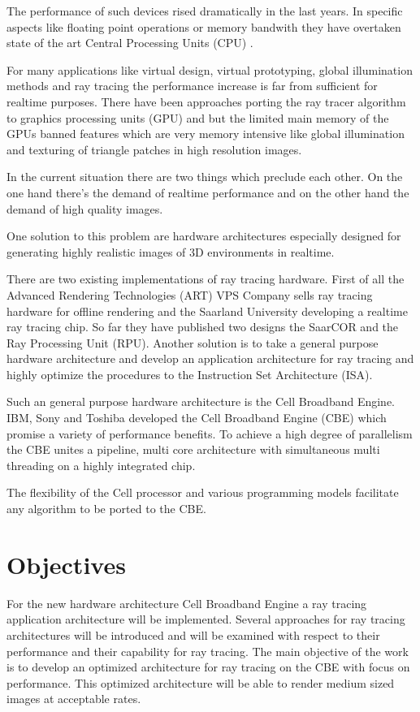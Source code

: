 \documentclass[DIV10, abstracton, openright, footsepline, headsepline, twoside, 9pt,
bigheadings]{scrreprt}
\begin{document}
The performance of such devices rised dramatically in the last years. In
specific aspects like floating point operations or memory bandwith they have
overtaken state of the art Central Processing Units (CPU) \cite{Wald04}.

For many applications like virtual design, virtual prototyping, global
illumination methods and ray tracing the performance increase is far from
sufficient for realtime purposes. There have been approaches porting
the ray tracer algorithm to graphics processing units (GPU) \cite{Purcell04} and
\cite{Christen05} but the limited main memory of the GPUs banned features which
are very memory intensive like global illumination and texturing of triangle
patches in high resolution images.

In the current situation there are two things which preclude each other. On
the one hand there's the demand of realtime performance and on the other hand
the demand of high quality images.

One solution to this problem are hardware architectures especially de\-signed
for generating highly realistic images of 3D environments in real\-time.

There are two existing implementations of ray tracing hardware. First of all
the Advanced Rendering Technologies (ART) VPS Company sells ray tracing
hardware for offline rendering and the Saarland University developing a
 realtime ray tracing chip. So
far they have published two designs the SaarCOR and the Ray Processing Unit
(RPU).
Another solution is to take a general purpose hardware architecture and
develop an application architecture for ray tracing and highly optimize the
procedures to the Instruction Set Architecture (ISA).

Such an general purpose hardware architecture is the Cell Broadband Engine.
IBM, Sony and Toshiba developed the Cell Broadband Engine (CBE) which promise a
variety of performance benefits. To achieve a high degree of parallelism the
CBE unites a pipeline, multi core architecture with simultaneous multi
threading on a highly integrated chip.

The flexibility of the Cell processor and various programming models facilitate
any algorithm to be ported to the CBE.
\section{Objectives}
For the new hardware architecture Cell Broadband Engine a ray tracing
application architecture will be implemented. Several approaches
for ray tracing architectures will be introduced and will be examined with
respect to their performance and their capability for ray tracing. The main
objective of the work is to develop an optimized architecture for ray tracing on
the CBE with focus on performance. This optimized architecture will be able to
render medium sized images at accep\-table rates.
\end{document}
